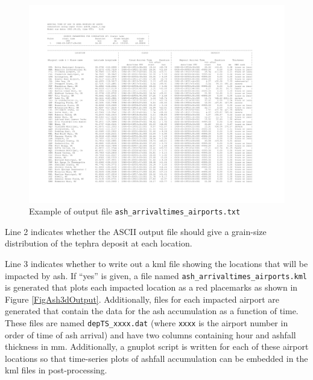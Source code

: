 \begin{figure}[htbp]\vspace*{-5cm}\hspace*{-2cm}
\includegraphics[angle=90,scale=0.9]{Figures/Chap_Usage_asharrivaltimesairports_p1.pdf}
\parbox{15cm}{\caption{\label{FigAshArrivTimeFormat}
Example of output file \texttt{ash\_arrivaltimes\_airports.txt}
}}
\end{figure}

Line 2 indicates whether the ASCII output file should give a grain-size distribution
of the tephra deposit at each location.

Line 3 indicates whether to write out a kml file showing the locations that will be
impacted by ash. If ``yes'' is given, a file named
\texttt{ash\_arrivaltimes\_airports.kml} is generated
that plots each impacted location as a red placemarks as shown in
Figure \ref{FigAsh3dOutput}.
Additionally, files for each impacted airport are generated that contain the data
for the ash accumulation as a function of time.  These files are named
\texttt{depTS\_xxxx.dat} (where \texttt{xxxx} is the airport number in order of
time of ash arrival) and have two columns containing hour and ashfall thickness
in $\mathrm{mm}$.  Additionally, a gnuplot script is written for each of these
airport locations so that time-series plots of ashfall accumulation can be embedded
in the kml files in post-processing.

